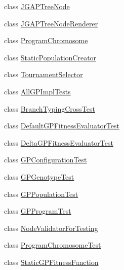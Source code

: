 \begin{DoxyCompactItemize}
\item 
class \hyperlink{classorg_1_1jgap_1_1gp_1_1impl_1_1_j_g_a_p_tree_node}{J\-G\-A\-P\-Tree\-Node}
\item 
class \hyperlink{classorg_1_1jgap_1_1gp_1_1impl_1_1_j_g_a_p_tree_node_renderer}{J\-G\-A\-P\-Tree\-Node\-Renderer}
\item 
class \hyperlink{classorg_1_1jgap_1_1gp_1_1impl_1_1_program_chromosome}{Program\-Chromosome}
\item 
class \hyperlink{classorg_1_1jgap_1_1gp_1_1impl_1_1_static_population_creator}{Static\-Population\-Creator}
\item 
class \hyperlink{classorg_1_1jgap_1_1gp_1_1impl_1_1_tournament_selector}{Tournament\-Selector}
\item 
class \hyperlink{classorg_1_1jgap_1_1gp_1_1impl_1_1_all_g_p_impl_tests}{All\-G\-P\-Impl\-Tests}
\item 
class \hyperlink{classorg_1_1jgap_1_1gp_1_1impl_1_1_branch_typing_cross_test}{Branch\-Typing\-Cross\-Test}
\item 
class \hyperlink{classorg_1_1jgap_1_1gp_1_1impl_1_1_default_g_p_fitness_evaluator_test}{Default\-G\-P\-Fitness\-Evaluator\-Test}
\item 
class \hyperlink{classorg_1_1jgap_1_1gp_1_1impl_1_1_delta_g_p_fitness_evaluator_test}{Delta\-G\-P\-Fitness\-Evaluator\-Test}
\item 
class \hyperlink{classorg_1_1jgap_1_1gp_1_1impl_1_1_g_p_configuration_test}{G\-P\-Configuration\-Test}
\item 
class \hyperlink{classorg_1_1jgap_1_1gp_1_1impl_1_1_g_p_genotype_test}{G\-P\-Genotype\-Test}
\item 
class \hyperlink{classorg_1_1jgap_1_1gp_1_1impl_1_1_g_p_population_test}{G\-P\-Population\-Test}
\item 
class \hyperlink{classorg_1_1jgap_1_1gp_1_1impl_1_1_g_p_program_test}{G\-P\-Program\-Test}
\item 
class \hyperlink{classorg_1_1jgap_1_1gp_1_1impl_1_1_node_validator_for_testing}{Node\-Validator\-For\-Testing}
\item 
class \hyperlink{classorg_1_1jgap_1_1gp_1_1impl_1_1_program_chromosome_test}{Program\-Chromosome\-Test}
\item 
class \hyperlink{classorg_1_1jgap_1_1gp_1_1impl_1_1_static_g_p_fitness_function}{Static\-G\-P\-Fitness\-Function}
\end{DoxyCompactItemize}
